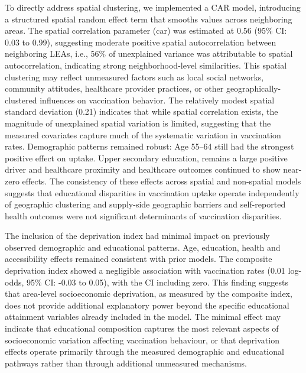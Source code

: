 \documentclass{article}
\begin{document}
To directly address spatial clustering, we implemented a CAR model,
introducing a structured spatial random effect term that smooths values
across neighboring areas. The spatial correlation parameter (car) was
estimated at 0.56 (95\% CI: 0.03 to 0.99), suggesting moderate positive
spatial autocorrelation between neighboring LEAs, i.e., 56\% of
unexplained variance was attributable to spatial autocorrelation,
indicating strong neighborhood-level similarities. This spatial
clustering may reflect unmeasured factors such as local social networks,
community attitudes, healthcare provider practices, or other
geographically-clustered influences on vaccination behavior. The
relatively modest spatial standard deviation (0.21) indicates that while
spatial correlation exists, the magnitude of unexplained spatial
variation is limited, suggesting that the measured covariates capture
much of the systematic variation in vaccination rates. Demographic
patterns remained robust: Age 55--64 still had the strongest positive
effect on uptake. Upper secondary education, remains a large positive
driver and healthcare proximity and healthcare outcomes continued to
show near-zero effects. The consistency of these effects across spatial
and non-spatial models suggests that educational disparities in
vaccination uptake operate independently of geographic clustering and
supply-side geographic barriers and self-reported health outcomes were
not significant determinants of vaccination disparities.

The inclusion of the deprivation index had minimal impact on previously
observed demographic and educational patterns. Age, education, health
and accessibility effects remained consistent with prior models. The
composite deprivation index showed a negligible association with
vaccination rates (0.01 log-odds, 95\% CI: -0.03 to 0.05), with the CI
including zero. This finding suggests that area-level socioeconomic
deprivation, as measured by the composite index, does not provide
additional explanatory power beyond the specific educational attainment
variables already included in the model. The minimal effect may indicate
that educational composition captures the most relevant aspects of
socioeconomic variation affecting vaccination behaviour, or that
deprivation effects operate primarily through the measured demographic
and educational pathways rather than through additional unmeasured
mechanisms.
\end{document}

